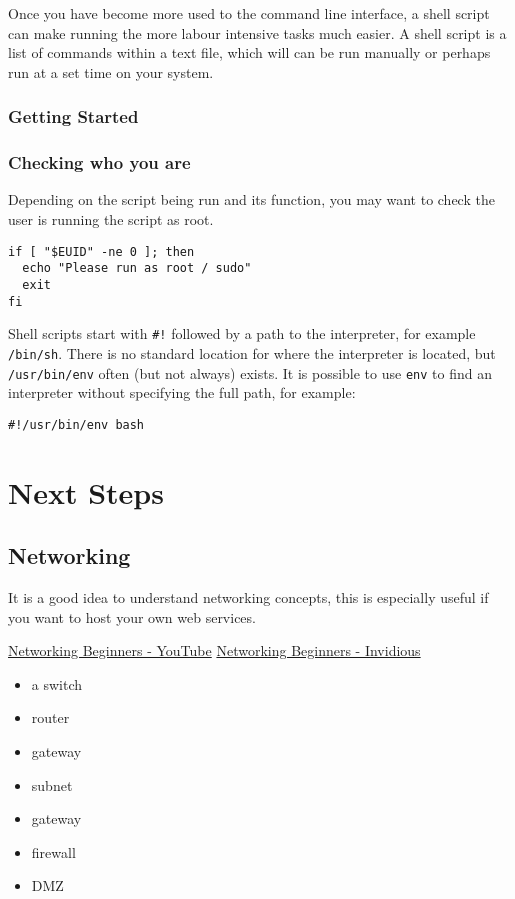 \documentclass{extbook}
\begin{document}
Once you have become more used to the command line interface, a shell script can make running the more labour intensive tasks much easier. A shell script is a list of commands within a text file, which will can be run manually or perhaps run at a set time on your system.

\subsection{Getting Started}


\subsection{Checking who you are}

Depending on the script being run and its function, you may want to check the user is running the script as root.

\begin{verbatim}
if [ "$EUID" -ne 0 ]; then
  echo "Please run as root / sudo"
  exit
fi
\end{verbatim}

Shell scripts start with \texttt{\#!} followed by a path to the interpreter, for example \texttt{/bin/sh}.
There is no standard location for where the interpreter is located, but \texttt{/usr/bin/env} often (but not always) exists.
It is possible to use \texttt{env} to find an interpreter without specifying the full path, for example:

\begin{verbatim}
#!/usr/bin/env bash
\end{verbatim}

\chapter{Next Steps}

\section{Networking}

It is a good idea to understand networking concepts, this is especially useful if you want to host your own web services.

\href{https://www.youtube.com/watch?v=\_IOZ8\_cPgu8}{Networking Beginners - YouTube}
\href{https://invidious.snopyta.org/watch?v=\_IOZ8\_cPgu8}{Networking Beginners - Invidious}

\begin{itemize}
\item a switch
\item router
\item gateway
\item subnet
\item gateway
\item firewall
\item DMZ
\end{itemize}
\end{document}
